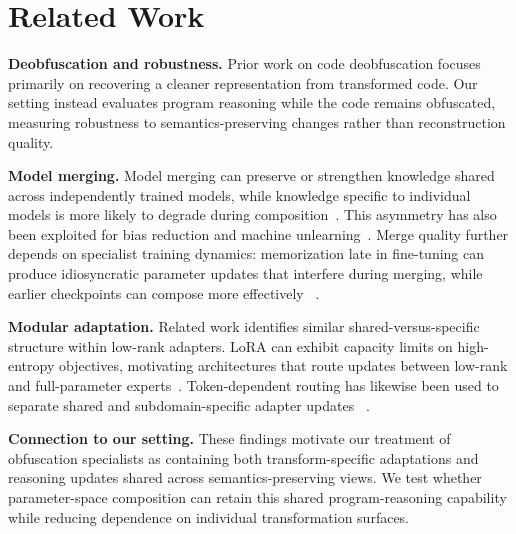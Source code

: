 \section{Related Work}

\textbf{Deobfuscation and robustness.}
Prior work on code deobfuscation focuses primarily on recovering a cleaner
representation from transformed code. Our setting instead evaluates program
reasoning while the code remains obfuscated, measuring robustness to
semantics-preserving changes rather than reconstruction quality.

\textbf{Model merging.}
Model merging can preserve or strengthen knowledge shared across independently
trained models, while knowledge specific to individual models is more likely to
degrade during composition~\cite{zaman-etal-2024-fuse,hess2025forgetting}.
This asymmetry has also been exploited for bias reduction and machine
unlearning~\cite{zaman-etal-2024-fuse,xu-etal-2025-zjuklab}.
Merge quality further depends on specialist training dynamics: memorization late
in fine-tuning can produce idiosyncratic parameter updates that interfere during
merging, while earlier checkpoints can compose more effectively
~\cite{horoi2026memorization}.

\textbf{Modular adaptation.}
Related work identifies similar shared-versus-specific structure within
low-rank adapters. LoRA can exhibit capacity limits on high-entropy objectives,
motivating architectures that route updates between low-rank and full-parameter
experts~\cite{tang2026beyond}. Token-dependent routing has likewise been used to
separate shared and subdomain-specific adapter updates
~\cite{chen2026alter}.

\textbf{Connection to our setting.}
These findings motivate our treatment of obfuscation specialists as containing
both transform-specific adaptations and reasoning updates shared across
semantics-preserving views. We test whether parameter-space composition can
retain this shared program-reasoning capability while reducing dependence on
individual transformation surfaces.
